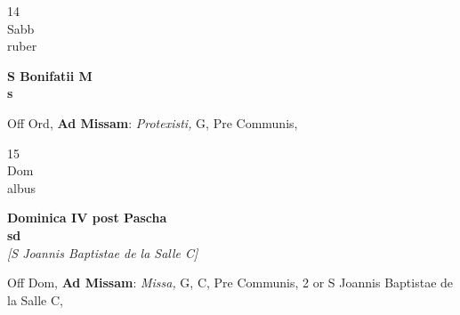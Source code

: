 \documentclass[10pt, openany]{book}
\begin{document}
        \begin{center}
            \begin{minipage}{3.5in}
                \vspace{2em}
                \begin{minipage}{0.5in}
                    {\Huge 14} \\
                    {\normalsize Sabb} \\
                    {\normalsize ruber}
                \end{minipage}
                \begin{minipage}{3.0in}
                    \textbf{ \large S Bonifatii M \\
                    \textnormal{\normalsize s}} \\ 
                \end{minipage}
                \begin{justify}Off Ord, \textbf{Ad Missam}: \textit{Protexisti,} G, Pre Communis,   
                \end{justify}
            \end{minipage}
        \end{center}
    
        \begin{center}
            \begin{minipage}{3.5in}
                \vspace{2em}
                \begin{minipage}{0.5in}
                    {\Huge 15} \\
                    {\normalsize Dom} \\
                    {\normalsize albus}
                \end{minipage}
                \begin{minipage}{3.0in}
                    \textbf{ \large Dominica IV post Pascha \\
                    \textnormal{\normalsize sd}} \\ \textit{[S Joannis Baptistae de la Salle C]} \\ 
                \end{minipage}
                \begin{justify}Off Dom, \textbf{Ad Missam}: \textit{Missa,} G, C, Pre Communis, 2 or S Joannis Baptistae de la Salle C,   
                \end{justify}
            \end{minipage}
        \end{center}
    
\end{document}
